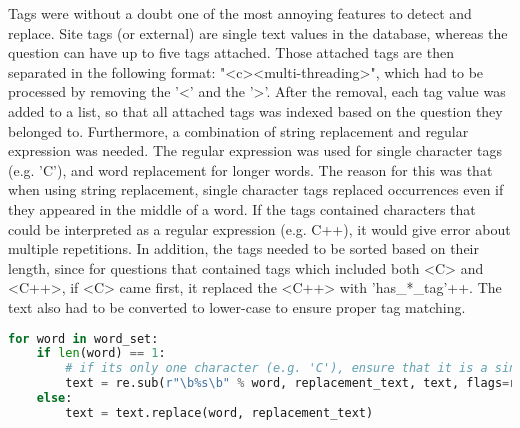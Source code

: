 \vspace{0.5em}\newline
Tags were without a doubt one of the most annoying features to detect and replace. 
Site tags (or external) are single text values in the database, whereas the question can have up to five tags attached. 
Those attached tags are then separated in the following format: "<c><multi-threading>", which had to be processed by removing the '<' and the '>'.
After the removal, each tag value was added to a list, so that all attached tags was indexed based on the question they belonged to. 
Furthermore, a combination of string replacement and regular expression was needed. 
The regular expression was used for single character tags (e.g. 'C'), and word replacement for longer words.
The reason for this was that when using string replacement, single character tags replaced occurrences even if they appeared in the middle of a word.
If the tags contained characters that could be interpreted as a regular expression (e.g. C++), it would give error about multiple repetitions.
In addition, the tags needed to be sorted based on their length, since for questions that contained tags which included both <C> and <C++>, 
if <C> came first, it replaced the <C++> with 'has\_*\_tag'++. The text also had to be converted to lower-case to ensure proper tag matching. 

\begin{lstlisting}[caption={Replacing tags in the question}, 
label={lst:pandas_categorical}, language={Python}, basicstyle=\small] 
for word in word_set:
	if len(word) == 1:
		# if its only one character (e.g. 'C'), ensure that it is a singular word by using regex
		text = re.sub(r"\b%s\b" % word, replacement_text, text, flags=re.IGNORECASE)
	else:
		text = text.replace(word, replacement_text)
\end{lstlisting}
